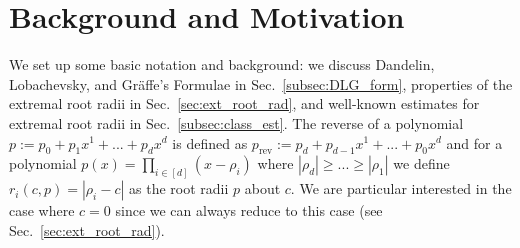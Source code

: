 \documentclass[runningheads]{llncs}
\begin{document}
\section{Background and Motivation}\label{srrapp}

We set up some basic notation and background: we discuss Dandelin, Lobachevsky, and Gr{\"a}ffe's Formulae in Sec.~\ref{subsec:DLG_form}, properties of the extremal root radii in Sec.~\ref{sec:ext_root_rad}, and well-known estimates for extremal root radii in Sec.~\ref{subsec:class_est}.
The reverse of a polynomial $p :=p_0+p_{1}x^1+...+p_dx^d$ is defined as $p_\text{rev}:=p_d+p_{d-1}x^1+...+p_0x^d$ and for a polynomial $p(x) = \prod_{i \in [d]} (x - \rho_i)$ where $|\rho_d|\geq ... \geq |\rho_1|$ we define $r_i(c,p) = |\rho_i - c|$ as the root radii $p$ about $c$. We are particular interested in the case where $c = 0$ since we can always reduce to this case (see Sec.~\ref{sec:ext_root_rad}).
%
%
\end{document}

